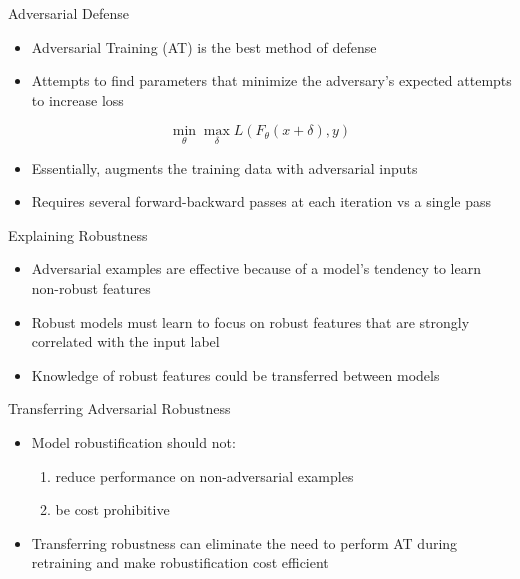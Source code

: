 \documentclass{beamer}
\begin{document}


\begin{frame}{Adversarial Defense}
	
	\begin{itemize}
		\item Adversarial Training (AT) is the best method of defense
		\item Attempts to find parameters that minimize the adversary's expected attempts to increase loss
	\end{itemize}

	$$\min_{\theta} \max_{\delta} L(F_\theta(x+\delta), y)$$

	\begin{itemize}
		\item Essentially, augments the training data with adversarial inputs
		\item Requires several forward-backward passes at each iteration vs a single pass
	\end{itemize}
	
\end{frame}



\begin{frame}{Explaining Robustness}
	
	\begin{itemize}
		\item Adversarial examples are effective because of a model's tendency to learn non-robust features
		\item Robust models must learn to focus on robust features that are strongly correlated with the input label
		\item Knowledge of robust features could be transferred between models
	\end{itemize}
	
\end{frame}



\begin{frame}{Transferring Adversarial Robustness}
	
	\begin{itemize}
	\item Model robustification should not:
	\begin{enumerate}
		\item reduce performance on non-adversarial examples
		\item be cost prohibitive
	\end{enumerate}
	\item Transferring robustness can eliminate the need to perform AT during retraining and make robustification cost efficient
\end{itemize}
	
\end{frame}
\end{document}
